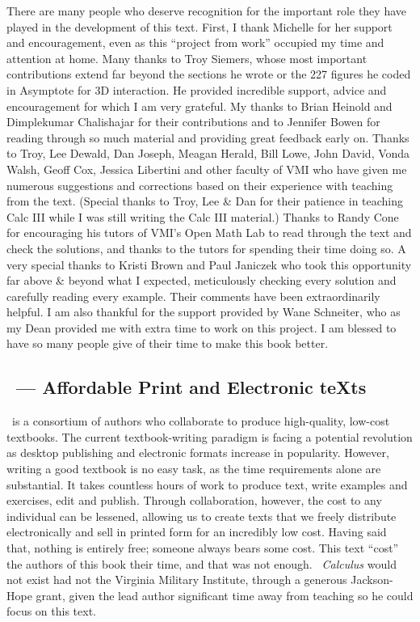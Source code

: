 \begin{itemize}
\begin{itemize}
There are many people who deserve recognition for the important role they have played in the development of this text. First, I thank Michelle for her support and encouragement, even as this ``project from work'' occupied my time and attention at home. Many thanks to Troy Siemers, whose most important contributions extend far beyond the sections he wrote or the 227 figures he coded in Asymptote for 3D interaction.  He provided incredible support, advice and encouragement for which I am very grateful. My thanks to Brian Heinold and Dimplekumar Chalishajar for their contributions and to Jennifer Bowen for reading through so much material and providing great feedback early on. Thanks to Troy, Lee Dewald, Dan Joseph, Meagan Herald, Bill Lowe, John David, Vonda Walsh, Geoff Cox, Jessica Libertini and other faculty of VMI who have given me numerous suggestions and corrections based on their experience with teaching from the text. (Special thanks to Troy, Lee \& Dan for their patience in teaching Calc III while I was still writing the Calc III material.) Thanks to Randy Cone for encouraging his tutors of VMI's Open Math Lab to read through the text and check the solutions, and thanks to the tutors for spending their time doing so. A very special thanks to Kristi Brown and Paul Janiczek who took this opportunity far above \& beyond what I expected, meticulously checking every solution and carefully reading every example. Their comments have been extraordinarily helpful. I am also thankful for the support provided by Wane Schneiter, who as my Dean provided me with extra time to work on this project. I am blessed to have so many people give of their time to make this book better.

\subsection{\apex\ --- Affordable Print and Electronic teXts}

\apex\ is a consortium of authors  who collaborate to produce high-quality, low-cost textbooks. The current textbook-writing paradigm is facing a potential revolution as desktop publishing and electronic formats increase in popularity. However, writing a good textbook is no easy task, as the time requirements alone are substantial. It takes countless hours of work to produce text, write examples and exercises, edit and publish. Through collaboration, however, the cost to any individual can be lessened, allowing us to create texts that we freely distribute electronically and sell in printed form for an incredibly low cost. Having said that, nothing is entirely free; someone always bears some cost. This text ``cost'' the authors of this book their time, and that was not enough. \emph{\apex\ Calculus} would not exist had not the Virginia Military Institute, through a generous Jackson-Hope grant, given the lead author significant time away from teaching so he could focus on this text.


\end{itemize}
\end{itemize}
